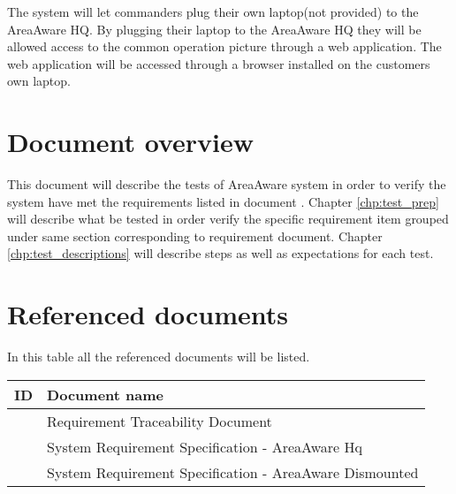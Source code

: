 The system will let commanders plug their own laptop(not provided) to the AreaAware HQ.
By plugging their laptop to the AreaAware HQ they will be allowed access to the common operation picture through a web application. 
The web application will be accessed through a browser installed on the customers own laptop.


\section{Document overview}
This document will describe the tests of AreaAware system in order to verify the system have met the requirements listed in document \srshq.
Chapter \ref{chp:test_prep} will describe what be tested in order verify the specific requirement item grouped under same section corresponding to requirement document.
Chapter \ref{chp:test_descriptions} will describe steps as well as expectations for each test.

\section{Referenced documents}
In this table all the referenced documents will be listed.

\begin{tabular}{b{6cm} b{7cm}}
	\textbf{ID} & \textbf{Document name} \\
	\hline
	\rtm & Requirement Traceability Document \\
	\srshq & System Requirement Specification - AreaAware Hq \\
	\srsdis & System Requirement Specification - AreaAware Dismounted \\
\end{tabular}
